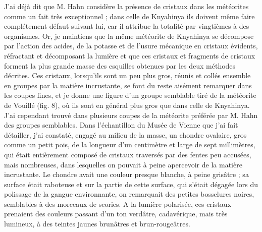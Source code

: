\documentclass[a4paper, 12pt, oneside, french]{book}
\begin{document}
J'ai déjà dit que M. Hahn considère la présence de cristaux dans les météorites comme un fait très exceptionnel ; dans celle de Knyahinya ils doivent même faire complétement défaut suivant lui, car il attribue la totalité par vingtièmes à des organismes. Or, je maintiens que la même météorite de Knyahinya se décompose par l'action des acides, de la potasse et de l'usure mécanique en cristaux évidents, réfractant et décomposant la lumière et que ces cristaux et fragments de cristaux forment la plus grande masse des esquilles obtenues par les deux méthodes décrites. Ces cristaux, lorsqu'ils sont un peu plus gros, réunis et collés ensemble en groupes par la matière incrustante, se font du reste aisément remarquer dans les coupes fines, et je donne une figure d'un groupe semblable tiré de la météorite de Vouillé (fig. 8), où ils sont en général plus gros que dans celle de Knyahinya. J'ai cependant trouvé dans plusieurs coupes de la météorite préférée par M. Hahn des groupes semblables. Dans l'échantillon du Musée de Vienne que j'ai fait détailler, j'ai constaté, engagé au milieu de la masse, un chondre ovalaire, gros comme un petit pois, de la longueur d'un centimètre et large de sept millimètres, qui était entièrement composé de cristaux traversés par des fentes peu accusées, mais nombreuses, dans lesquelles on pouvait à peine apercevoir de la matière incrustante. Le chondre avait une couleur presque blanche, à peine grisâtre ; sa surface était raboteuse et sur la partie de cette surface, qui s'était dégagée lors du polissage de la gangue environnante, on remarquait des petites bosselures noires, semblables à des morceaux de scories. A la lumière polarisée, ces cristaux prenaient des couleurs passant d'un ton verdâtre, cadavérique, mais très lumineux, à des teintes jaunes brunâtres et brun-rougeâtres.
\end{document}
